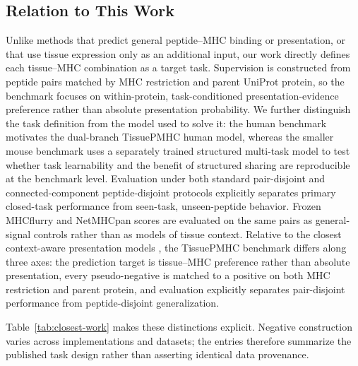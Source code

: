 \subsection{Relation to This Work}

Unlike methods that predict general peptide--MHC binding or presentation, or that use tissue expression only as an additional input, our work directly defines each tissue--MHC combination as a target task. Supervision is constructed from peptide pairs matched by MHC restriction and parent UniProt protein, so the benchmark focuses on within-protein, task-conditioned presentation-evidence preference rather than absolute presentation probability. We further distinguish the task definition from the model used to solve it: the human benchmark motivates the dual-branch TissuePMHC human model, whereas the smaller mouse benchmark uses a separately trained structured multi-task model to test whether task learnability and the benefit of structured sharing are reproducible at the benchmark level. Evaluation under both standard pair-disjoint and connected-component peptide-disjoint protocols explicitly separates primary closed-task performance from seen-task, unseen-peptide behavior. Frozen MHCflurry and NetMHCpan scores are evaluated on the same pairs as general-signal controls rather than as models of tissue context. Relative to the closest context-aware presentation models \cite{odonnell2020mhcflurry,albert2023bigmhc}, the TissuePMHC benchmark differs along three axes: the prediction target is tissue--MHC preference rather than absolute presentation, every pseudo-negative is matched to a positive on both MHC restriction and parent protein, and evaluation explicitly separates pair-disjoint performance from peptide-disjoint generalization.

Table~\ref{tab:closest-work} makes these distinctions explicit. Negative construction varies across implementations and datasets; the entries therefore summarize the published task design rather than asserting identical data provenance.

